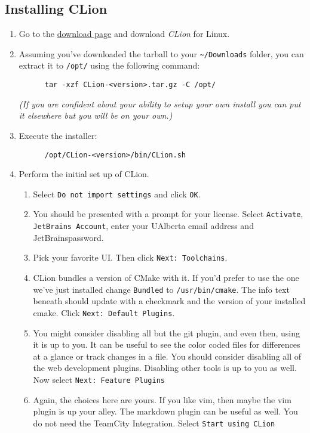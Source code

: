 \documentclass[../setup.tex]{subfiles}
\begin{document}
\subsection{Installing CLion}
\begin{enumerate}
  \item
    Go to the \href{https://www.jetbrains.com/clion/download/\#section=linux} {download page} and
    download \textit{CLion} for Linux.
  \item
    Assuming you've downloaded the tarball to your \lstinline{~/Downloads} folder, you can extract
    it to \lstinline{/opt/} using the following command:
    \begin{lstlisting}
      tar -xzf CLion-<version>.tar.gz -C /opt/
    \end{lstlisting}
    \textit{(If you are confident about your ability to setup your own install you can put it
    elsewhere but you will be on your own.)}
  \item
    Execute the installer:
    \begin{lstlisting}
      /opt/CLion-<version>/bin/CLion.sh
    \end{lstlisting}
  \item
    Perform the initial set up of CLion.
    \begin{enumerate}
      \item
        Select \texttt{Do not import settings} and click \texttt{OK}.
      \item
        You should be presented with a prompt for your license. Select \texttt{Activate},
        \texttt{JetBrains Account}, enter your UAlberta email address and JetBrainspassword.
      \item
        Pick your favorite UI. Then click \texttt{Next: Toolchains}.
      \item
        CLion bundles a version of CMake with it. If you'd prefer to use the one we've just
        installed change \texttt{Bundled} to \lstinline{/usr/bin/cmake}. The info text beneath
        should update with a checkmark and the version of your installed cmake. Click
        \texttt{Next: Default Plugins}.
      \item
        You might consider disabling all but the git plugin, and even then, using it is up to you.
        It can be useful to see the color coded files for differences at a glance or track changes
        in a file. You should consider disabling all of the web development plugins. Disabling
        other tools is up to you as well. Now select \texttt{Next: Feature Plugins}
      \item
        Again, the choices here are yours. If you like vim, then maybe the vim plugin is up your
        alley. The markdown plugin can be useful as well. You do not need the TeamCity Integration.
        Select \texttt{Start using CLion}
    \end{enumerate}
\end{enumerate}
\end{document}
